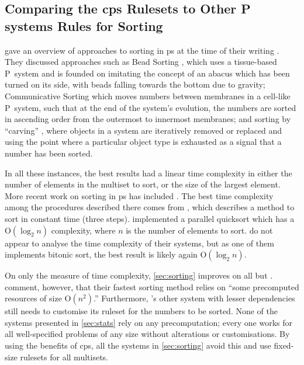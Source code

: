 \subsection{Comparing the \texorpdfstring{\gls{cps}}{cP systems} Rulesets to Other P systems Rules for Sorting}

\citeauthor{Ceterchi2010} gave an overview of approaches to sorting in \gls{ps} at the time of their writing \cite{Ceterchi2010}.  They discussed approaches such as Bead Sorting \cite{Arulanandham2002}, which uses a tissue-based P~system and is founded on imitating the concept of an abacus which has been turned on its side, with beads falling towards the bottom due to gravity; Communicative Sorting \cite[Sec. 5.2]{Alhazov2007} which moves numbers between membranes in a cell-like P~system, such that at the end of the system's evolution, the numbers are sorted in ascending order from the outermost to innermost membranes; and sorting by ``carving'' \cite{Alhazov2007}, where objects in a system are iteratively removed or replaced and using the point where a particular object type is exhausted as a signal that a number has been sorted.

In all these instances, the best results had a linear time complexity in either the number of elements in the multiset to sort, or the size of the largest element.  More recent work on sorting in \gls{ps} has included \cite{Gheorghe2017,Metta2015,Yan2019}.  The best time complexity among the procedures described there comes from \cite[Sec. 3.3]{Gheorghe2017}, which describes a method to sort in constant time (three steps).  \citeauthor{Yan2019} \cite{Yan2019} implemented a parallel quicksort which has a O\((\log_2 n)\) complexity, where \(n\) is the number of elements to sort.  \citeauthor{Metta2015} \cite{Metta2015} do not appear to analyse the time complexity of their systems, but as one of them implements bitonic sort, the best result is likely again O\((\log_2 n)\).

On only the measure of time complexity, \cref{sec:sorting} improves on all but \cite{Gheorghe2017}.  \citeauthor{Gheorghe2017} comment, however, that their fastest sorting method relies on ``some precomputed resources of size O\((n^2)\).''  Furthermore, \cite{Gheorghe2017}'s other system with lesser dependencies still needs to customise its ruleset for the numbers to be sorted.  None of the systems presented in \cref{sec:stats} rely on any precomputation; every one works for all well-specified problems of any size without alterations or customisations.  By using the benefits of \gls{cps}, all the systems in \cref{sec:sorting} avoid this and use fixed-size rulesets for all multisets.

